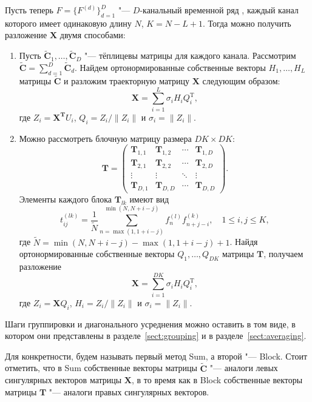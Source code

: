 \documentclass[specialist,
substylefile = spbu_report.rtx,
subf,href,colorlinks=true, 12pt]{disser}
\newcommand{\traj}{\mathbf{X}}
\newcommand{\toeplitz}{\widetilde{\mathbf{C}}}
\theoremstyle{definition}
\begin{document}
	Пусть теперь $F=\{F^{(d)}\}_{d=1}^D$ "--- $D$-канальный временной ряд , каждый канал которого имеет одинаковую длину $N$, $K=N-L+1$. Тогда можно получить разложение $\mathbf{X}$ двумя способами:
	\begin{enumerate}
		\item Пусть $\toeplitz_1,\ldots,\toeplitz_D$ "--- тёплицевы матрицы для каждого канала. Рассмотрим $\toeplitz=\sum_{d=1}^D \toeplitz_d$. Найдем ортонормированные собственные векторы $H_1,\ldots,H_L$ матрицы $\toeplitz$ и разложим траекторную матрицу $\traj$ следующим образом:
		\begin{equation}\label{eq:sum_decomposition}
			\mathbf{X}=\sum_{i=1}^L \sigma_i H_i Q_i^\mathrm{T},
		\end{equation}
		где $Z_i=\mathbf{X^T}U_i$, $Q_i=Z_i/\|Z_i\|$ и $\sigma_i=\|Z_i\|$.
		\item Можно рассмотреть блочную матрицу размера $DK\times DK$:
		\[
		\mathbf{T}=\begin{pmatrix}
			\mathbf{T}_{1,1} & \mathbf{T}_{1,2} & \cdots & \mathbf{T}_{1,D} \\
			\mathbf{T}_{2,1} & \mathbf{T}_{2,2} & \cdots & \mathbf{T}_{2,D} \\
			\vdots  & \vdots  & \ddots & \vdots  \\
			\mathbf{T}_{D,1} & \mathbf{T}_{D,D} & \cdots & \mathbf{T}_{D,D}
		\end{pmatrix}.
		\]
		Элементы каждого блока $\mathbf{T}_{lk}$ имеют вид
		\[
		t^{(lk)}_{ij}=\frac{1}{\tilde N}\sum_{n=\max(1,1+i-j)}^{\min(N,N+i-j)} f^{(l)}_nf^{(k)}_{n+j-i},\quad 1\leqslant i,j\leqslant K,
		\]
		где $\tilde N=\min(N,N+i-j)-\max(1,1+i-j)+1$. Найдя ортонормированные собственные векторы $Q_1,\ldots,Q_{DK}$ матрицы $\mathbf{T}$, получаем разложение
		\begin{equation}\label{eq:block_decomposition}
			\mathbf{X}=\sum_{i=1}^{DK} \sigma_i H_i Q_i^\mathrm{T},    
		\end{equation}
		где $Z_i=\mathbf{X}Q_i$, $H_i=Z_i/\|Z_i\|$ и $\sigma_i=\|Z_i\|$.
	\end{enumerate}
	Шаги группировки и диагонального усреднения можно оставить в том виде, в котором они представлены в разделе~\ref{sect:grouping} и в разделе~\ref{sect:averaging}.
	
	Для конкретности, будем называть первый метод Sum, а второй "--- Block. Стоит отметить, что в Sum собственные векторы матрицы $\toeplitz$ "--- аналоги левых сингулярных векторов матрицы $\mathbf{X}$, в то время как в Block собственные векторы матрицы $\mathbf{T}$ "--- аналоги правых сингулярных векторов.
\end{document}

